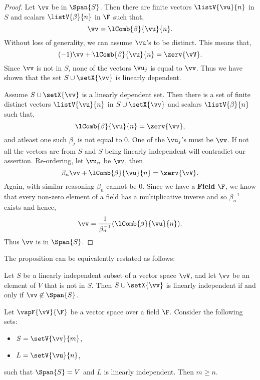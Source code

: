 \begin{proof}
    Let $\vv$ be in $\Span{S}$. Then there are finite vectors $\listV{\vu}{n}$ in $S$ and scalars
    $\listV{\beta}{n}$ in $\F$ such that,
    \[\vv = \lComb{\beta}{\vu}{n}.\]
    Without loss of generality, we can assume $\vu$'s to be distinct. This means that,
    \[(-1)\vv + \lComb{\beta}{\vu}{n} = \zerv{\vV}.\]
    Since $\vv$ is not in $S$, none of the vectors $\vu_{j}$ is equal to $\vv$. Thus we have shown that the
    set $S\cup\setX{\vv}$ is linearly dependent.

    Assume $S\cup\setX{\vv}$ is a linearly dependent set. Then there is a set of finite distinct vectors
    $\listV{\vu}{n}$ in $S\cup\setX{\vv}$ and scalars $\listV{\beta}{n}$ such that,
    \[\lComb{\beta}{\vu}{n} = \zerv{\vv},\]
    and atleast one such $\beta_{j}$ is not equal to $0$. One of the $\vu_{j}$'s must be $\vv$. If not all the
    vectors are from $S$ and $S$ being linearly independent will contradict our assertion. Re-ordering, let
    $\vu_n$ be $\vv$, then
    \[\beta_{n}\vv + \lComb{\beta}{\vu}{n} = \zerv{\vV}.\]
    Again, with similar reasoning $\beta_{n}$ cannot be $0$. Since we have a \textbf{Field} $\F$, we know that
    every non-zero element of a field has a multiplicative inverse and so $\beta_n^{-1}$ exists and hence,
    \[\vv = \frac{1}{\beta_n^{-1}}(\lComb{\beta}{\vu}{n}).\]
    Thus $\vv$ is in $\Span{S}$.
\end{proof}
The proposition can be equivalently restated as follows:
\begin{Remark}
Let $S$ be a linearly independent subset of a vector space $\vV$, and let $\vv$ be an element of $V$ that
is not in $S$. Then $S\cup\setX{\vv}$ is linearly independent if and only if $\vv\not\in\Span{S}$.
\end{Remark}
\begin{Theorem}[name=Exchange Lemma]\label{thm:exch_lemma}
    Let $\vspF{\vV}{\F}$ be a vector space over a field $\F$. Consider the following sets:
    \begin{itemize}
	\item
	    $S = \setV{\vv}{m}$,
	\item
	    $L = \setV{\vu}{n}$,
    \end{itemize}
    such that $\Span{S} = V$ and $L$ is linearly independent. Then $m\geq n$.
\end{Theorem}

